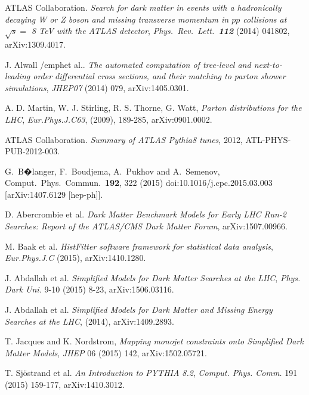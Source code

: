 ATLAS Collaboration. \emph{Search for dark matter in events with a hadronically decaying W or Z boson and missing transverse momentum in $pp$ collisions at $\sqrt{s} =$ 8 TeV with the ATLAS detector}, \emph{Phys.\ Rev.\ Lett.\  {\bf 112}} (2014) 041802, arXiv:1309.4017.

J. Alwall /emph{et al.}. \emph{The automated computation of tree-level and next-to-leading order differential cross sections, and their matching to parton shower simulations}, \emph{JHEP07} (2014) 079, arXiv:1405.0301.

A. D. Martin, W. J. Stirling, R. S. Thorne, G. Watt, \emph{Parton distributions for the LHC}, \emph{Eur.Phys.J.C63}, (2009), 189-285, arXiv:0901.0002.

ATLAS Collaboration. \emph{Summary of ATLAS Pythia8 tunes}, 2012, ATL-PHYS-PUB-2012-003.

  G.~B�langer, F.~Boudjema, A.~Pukhov and A.~Semenov,
  Comput.\ Phys.\ Commun.\  {\bf 192}, 322 (2015)
  doi:10.1016/j.cpc.2015.03.003
  [arXiv:1407.6129 [hep-ph]].

D. Abercrombie et al. \emph{Dark Matter Benchmark Models for Early LHC Run-2 Searches: Report of the ATLAS/CMS Dark Matter Forum}, arXiv:1507.00966.

M. Baak et al. \emph{HistFitter software framework for statistical data analysis}, \emph{Eur.Phys.J.C} (2015), arXiv:1410.1280.

J. Abdallah et al. \emph{Simplified Models for Dark Matter Searches at the LHC}, \emph{Phys. Dark Uni.} 9-10 (2015) 8-23, arXiv:1506.03116.

J. Abdallah et al. \emph{Simplified Models for Dark Matter and Missing Energy Searches at the LHC}, (2014), arXiv:1409.2893.

T. Jacques and K. Nordstrom, \emph{Mapping monojet constraints onto Simplified Dark Matter Models}, \emph{JHEP} 06 (2015) 142, arXiv:1502.05721.

T. Sjöstrand et al. \emph{An Introduction to PYTHIA 8.2}, \emph{Comput. Phys. Comm.} 191 (2015) 159-177, arXiv:1410.3012.

